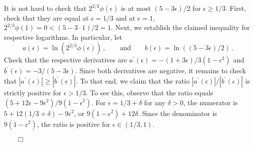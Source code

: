   It is not hard to check that 
  $2^{2/3} \phi(\epsilon)$ is at most $(5 - 3\epsilon)/2$ for $\epsilon \geq 1/3$. 
  First, check that they are equal at $\epsilon = 1/3$ and 
  at $\epsilon = 1$, $2^{2/3}\phi(1) = 0 < (5 - 3\cdot 1)/2 = 1$.
  Next, we establish the claimed
  inequality for respective logarithms. 
  In particular, let 
  \[
      a(\epsilon) = \ln\left( 2^{2/3} \phi(\epsilon) \right)
      \,,\qquad\text{and}\qquad 
      b(\epsilon) = \ln\left( (5 - 3 \epsilon)/2\right)
      \,.
  \]
  Check that the respective derivatives are 
  $a^\prime(\epsilon) = -(1+3 \epsilon)/3(1 - \epsilon^2)$ 
  and $b^\prime(\epsilon) = - 3/(5 - 3\epsilon)$. 
  Since both derivatives are negative, it remains to check that $|a^\prime(\epsilon)| \geq |b^\prime(\epsilon)|$. 
  To that end, we claim that the ratio $|a^\prime(\epsilon)|/|b^\prime(\epsilon)|$ 
  is strictly positive for $\epsilon > 1/3$. 
  To see this, observe that the ratio equals $(5 + 12 \epsilon - 9 \epsilon^2)/9(1-\epsilon^2)$. 
  For $\epsilon = 1/3 + \delta$ for any $\delta > 0$, 
  the numerator is $5 + 12 (1/3 + \delta) - 9 \epsilon^2$, 
  or $9(1 - \epsilon^2) + 12\delta$. 
  Since the denominator is $9(1 - \epsilon^2)$, the ratio is positive for $\epsilon \in(1/3, 1)$. 

\hfill$\qed$